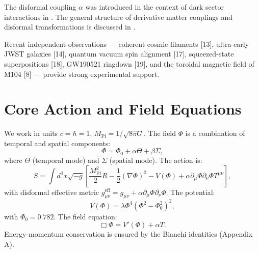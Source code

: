 \documentclass[12pt, a4paper]{article}
\begin{document}
The disformal coupling $\alpha$ was introduced in the context of dark sector interactions in \cite{zumalacarregui2010}. The general structure of derivative matter couplings and disformal transformations is discussed in \cite{zumalacarregui2013}.

Recent independent observations — coherent cosmic filaments [13], ultra-early JWST galaxies [14], quantum vacuum spin alignment [17], squeezed-state superpositions [18], GW190521 ringdown [19], and the toroidal magnetic field of M104 [8] — provide strong experimental support.

\section{Core Action and Field Equations}
\label{sec:action}
We work in units $c = \hbar = 1$, $M_{\mathrm{Pl}} = 1/\sqrt{8\pi G}$. The field $\Phi$ is a combination of temporal and spatial components:
\begin{equation}
\Phi = \Phi_0 + \alpha \Theta + \beta \Sigma,
\label{eq:phi_components}
\end{equation}
where $\Theta$ (temporal mode) and $\Sigma$ (spatial mode). The action is:
\begin{equation}
S = \int d^4x \sqrt{-g} \left[ \frac{M_{\mathrm{Pl}}^2}{2} R - \frac{1}{2}(\nabla\Phi)^2 - V(\Phi) + \alpha \partial_\mu \Phi \partial_\nu \Phi T^{\mu\nu} \right],
\label{eq:action}
\end{equation}
with disformal effective metric $g_{\mu\nu}^{\mathrm{eff}} = g_{\mu\nu} + \alpha \partial_\mu \Phi \partial_\nu \Phi$. The potential:
\begin{equation}
V(\Phi) = \lambda \Phi^4 (\Phi^2 - \Phi_0^2)^2,
\label{eq:potential}
\end{equation}
with $\Phi_0 = 0.782$. The field equation:
\begin{equation}
\Box \Phi = V'(\Phi) + \alpha T.
\label{eq:field}
\end{equation}
Energy-momentum conservation is ensured by the Bianchi identities (Appendix A).
\end{document}
